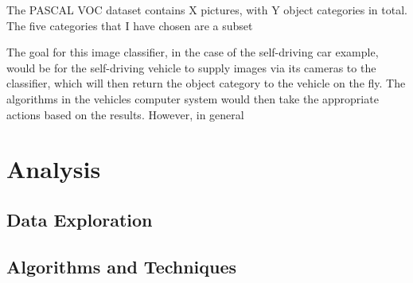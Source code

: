 \documentclass[10pt,a4paper]{article}
\begin{document}
The PASCAL VOC dataset contains X pictures, with Y object categories in total. The five categories that I have chosen are a subset 

The goal for this image classifier, in the case of the self-driving car example, would be for the self-driving vehicle to supply images via its cameras to the classifier, which will then return the object category to the vehicle on the fly. The algorithms in the vehicles computer system would then take the appropriate actions based on the results. However, in general 

 

\newpage
\section{Analysis}

\subsection{Data Exploration}
%


\subsection{Algorithms and Techniques}
%
\end{document}

